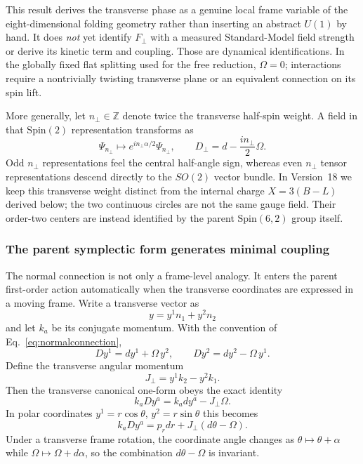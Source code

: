 \documentclass[11pt]{article}
\theoremstyle{definition}\newtheorem{definition}[theorem]{Definition}
\theoremstyle{remark}\newtheorem{remark}[theorem]{Remark}\newtheorem{conjecture}[theorem]{Conjecture}
\begin{document}
This result derives the transverse phase as a genuine local frame variable of the eight-dimensional folding geometry rather than inserting an abstract $U(1)$ by hand. It does \emph{not} yet identify $F_\perp$ with a measured Standard-Model field strength or derive its kinetic term and coupling. Those are dynamical identifications. In the globally fixed flat splitting used for the free reduction, $\Omega=0$; interactions require a nontrivially twisting transverse plane or an equivalent connection on its spin lift.

More generally, let $n_\perp\in\mathbb Z$ denote twice the transverse half-spin weight. A field in that $\mathrm{Spin}(2)$ representation transforms as
\begin{equation}\label{eq:oddspincharge}
 \Psi_{n_\perp}\mapsto e^{in_\perp\alpha/2}\Psi_{n_\perp},
 \qquad
 D_\perp=d-\frac{i n_\perp}{2}\Omega.
\end{equation}
Odd $n_\perp$ representations feel the central half-angle sign, whereas even $n_\perp$ tensor representations descend directly to the $SO(2)$ vector bundle. In Version~18 we keep this transverse weight distinct from the internal charge $X=3(B-L)$ derived below; the two continuous circles are not the same gauge field. Their order-two centers are instead identified by the parent $\mathrm{Spin}(6,2)$ group itself.

\subsubsection{The parent symplectic form generates minimal coupling}
The normal connection is not only a frame-level analogy. It enters the parent first-order action automatically when the transverse coordinates are expressed in a moving frame. Write a transverse vector as
\begin{equation}
 y=y^1n_1+y^2n_2
\end{equation}
and let $k_a$ be its conjugate momentum. With the convention of Eq.~\eqref{eq:normalconnection},
\begin{equation}\label{eq:Dyreal}
 Dy^1=dy^1+\Omega\,y^2,
 \qquad
 Dy^2=dy^2-\Omega\,y^1.
\end{equation}
Define the transverse angular momentum
\begin{equation}\label{eq:Jperp}
 J_\perp=y^1k_2-y^2k_1.
\end{equation}
Then the transverse canonical one-form obeys the exact identity
\begin{equation}\label{eq:canonicalnormalcoupling}
 \boxed{
 k_aDy^a
 =k_a dy^a-J_\perp\Omega.}
\end{equation}
In polar coordinates $y^1=r\cos\theta$, $y^2=r\sin\theta$ this becomes
\begin{equation}\label{eq:polarcanonical}
 \boxed{
 k_aDy^a=p_rdr+J_\perp(d\theta-\Omega).}
\end{equation}
Under a transverse frame rotation, the coordinate angle changes as $\theta\mapsto\theta+\alpha$ while $\Omega\mapsto\Omega+d\alpha$, so the combination $d\theta-\Omega$ is invariant.
\end{document}
